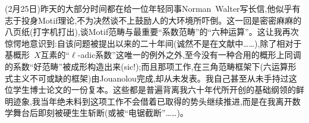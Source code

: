 (2月25日)昨天的大部分时间都在给一位年轻同事Norman~Walter写长信,他似乎有志于投身Motif理论,不为决然谈不上鼓励人的大环境所吓倒。这一回是密密麻麻的八页纸(打字机打出),谈Motif范畴与最重要“系数范畴”的“六种运算”。这让我再次惊愕地意识到:自该问题被提出以来的二十年间(诚然不是在文献中……),除了相对于基概形~$X$互素的“$\ell$-adic系数”这唯一的例外之外,至今没有一种合用的概形上同调的系数“好范畴”被成形构造出来(sic!);而且那项工作,在三角范畴框架下(六运算形式主义不可或缺的框架)由Jouanolou完成,却从未发表。我自己甚至从未手持过这位学生博士论文的一份复本。这些都是普遍背离我六十年代所开创的基础纲领的鲜明迹象\dmark{},我当年绝未料到这项工作不会借着已取得的势头继续推进,而是在我离开数学舞台后即刻被硬生生斩断(或被“电锯截断”……)。

